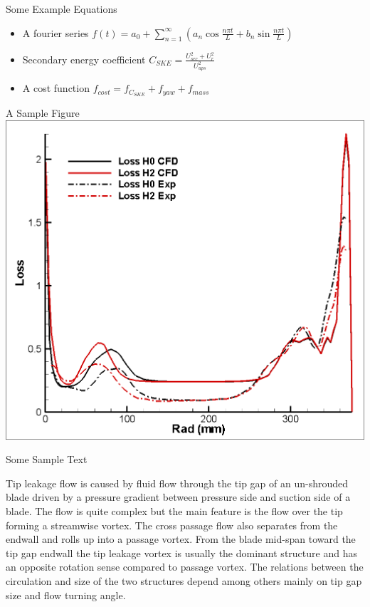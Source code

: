 \documentclass[final]{beamer}
\begin{document}
\begin{frame}{}
\begin{columns}[t]
      \begin{column}{.48\linewidth}
        \begin{block}{Some Example Equations}
          \begin{itemize}
          \item A fourier series $f\left(t\right)=a_{0} +
            \sum^{\infty}_{n=1} \left(a_{n} \cos \frac{n \pi t}{L} +
              b_{n} \sin \frac{n \pi t}{L}\right)$
        \item Secondary energy coefficient $C_{SKE} = \frac{U^2_{sec}
            + U^2_r}{U^2_{ups}}$
        \item A cost function $f_{cost} = f_{C_{SKE}}+f_{yaw} +
          f_{mass}$
          \end{itemize}
        \end{block}

        \begin{block}{A Sample Figure}
          \includegraphics[width=\columnwidth]{pa_loss}  
        \end{block}

 \begin{block}{Some Sample Text}

          Tip leakage flow is caused by fluid flow through the tip gap
          of an un-shrouded blade driven by a pressure gradient
          between pressure side and suction side of a blade. The flow
          is quite complex but the main feature is the flow over the
          tip forming a streamwise vortex. The cross passage flow also
          separates from the endwall and rolls up into a passage
          vortex. From the blade mid-span toward the tip gap endwall
          the tip leakage vortex is usually the dominant structure and
          has an opposite rotation sense compared to passage
          vortex. The relations between the circulation and size of
          the two structures depend among others mainly on tip gap
          size and flow turning angle.


\end{block}
\end{column}
\end{columns}
\end{frame}
\end{document}
